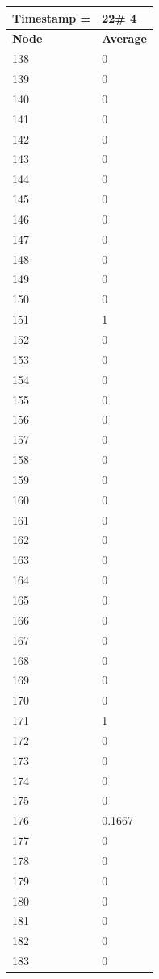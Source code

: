 \begin{tabular}{|l||l|}
\hline
\textbf{Timestamp =} & \textbf{22}\# 4\\\hline
	\textbf{Node} & \textbf{Average} \\ \hline
\hline
	138 & 0 \\ \hline
	139 & 0 \\ \hline
	140 & 0 \\ \hline
	141 & 0 \\ \hline
	142 & 0 \\ \hline
	143 & 0 \\ \hline
	144 & 0 \\ \hline
	145 & 0 \\ \hline
	146 & 0 \\ \hline
	147 & 0 \\ \hline
	148 & 0 \\ \hline
	149 & 0 \\ \hline
	150 & 0 \\ \hline
	151 & 1 \\ \hline
	152 & 0 \\ \hline
	153 & 0 \\ \hline
	154 & 0 \\ \hline
	155 & 0 \\ \hline
	156 & 0 \\ \hline
	157 & 0 \\ \hline
	158 & 0 \\ \hline
	159 & 0 \\ \hline
	160 & 0 \\ \hline
	161 & 0 \\ \hline
	162 & 0 \\ \hline
	163 & 0 \\ \hline
	164 & 0 \\ \hline
	165 & 0 \\ \hline
	166 & 0 \\ \hline
	167 & 0 \\ \hline
	168 & 0 \\ \hline
	169 & 0 \\ \hline
	170 & 0 \\ \hline
	171 & 1 \\ \hline
	172 & 0 \\ \hline
	173 & 0 \\ \hline
	174 & 0 \\ \hline
	175 & 0 \\ \hline
	176 & 0.1667 \\ \hline
	177 & 0 \\ \hline
	178 & 0 \\ \hline
	179 & 0 \\ \hline
	180 & 0 \\ \hline
	181 & 0 \\ \hline
	182 & 0 \\ \hline
	183 & 0 \\ \hline
\end{tabular}
